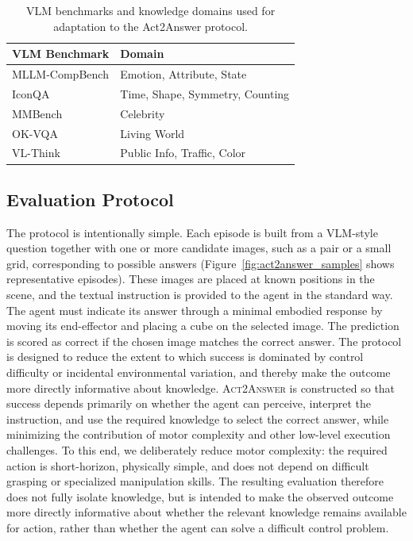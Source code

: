 \documentclass{llmxive}
\begin{document}
\begin{table}[b]
\centering
\small
\begin{tabular}{ll}
\toprule
\textbf{VLM Benchmark} & \textbf{Domain} \\
\midrule
MLLM-CompBench & Emotion, Attribute, State \\
IconQA & Time, Shape, Symmetry, Counting \\
MMBench & Celebrity \\
OK-VQA & Living World \\
VL-Think & Public Info, Traffic, Color \\
\bottomrule
\end{tabular}
\caption{VLM benchmarks and knowledge domains used for adaptation to the Act2Answer protocol.}
\label{tab:vlm2vla_benchmarks}
\end{table}

\subsection{Evaluation Protocol}
The protocol is intentionally simple. Each episode is built from a VLM-style question together with one or more candidate images, such as a pair or a small grid, corresponding to possible answers (Figure~\ref{fig:act2answer_samples} shows representative episodes). These images are placed at known positions in the scene, and the textual instruction is provided to the agent in the standard way. The agent must indicate its answer through a minimal embodied response by moving its end-effector and placing a cube on the selected image. The prediction is scored as correct if the chosen image matches the correct answer. The protocol is designed to reduce the extent to which success is dominated by control difficulty or incidental environmental variation, and thereby make the outcome more directly informative about knowledge. \textsc{Act2Answer} is constructed so that success depends primarily on whether the agent can perceive, interpret the instruction, and use the required knowledge to select the correct answer, while minimizing the contribution of motor complexity and other low-level execution challenges. To this end, we deliberately reduce motor complexity: the required action is short-horizon, physically simple, and does not depend on difficult grasping or specialized manipulation skills. The resulting evaluation therefore does not fully isolate knowledge, but is intended to make the observed outcome more directly informative about whether the relevant knowledge remains available for action, rather than whether the agent can solve a difficult control problem.
\end{document}
